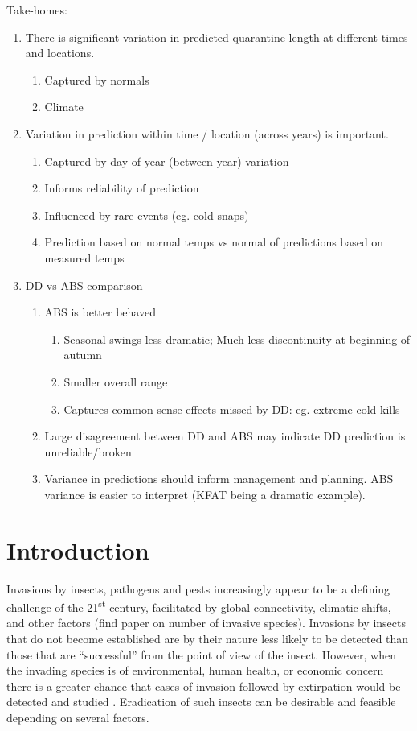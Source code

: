 \documentclass[10pt,a4paper,twocolumn]{article}
\begin{document}
Take-homes:
\begin{enumerate}
\item There is significant variation in predicted quarantine length 
at different times and locations.
  \begin{enumerate}
  \item Captured by normals
  \item Climate
  \end{enumerate}
\item Variation in prediction within time / location (across years) 
is important.
  \begin{enumerate}
  \item Captured by day-of-year (between-year) variation
  \item Informs reliability of prediction
  \item Influenced by rare events (eg. cold snaps)
  \item Prediction based on normal temps vs normal 
  of predictions based on measured temps
  \end{enumerate}
\item DD vs ABS comparison
  \begin{enumerate}
  \item ABS is better behaved
    \begin{enumerate}
    \item Seasonal swings less dramatic; 
    Much less discontinuity at beginning of autumn 
    \item Smaller overall range
    \item Captures common-sense effects missed by DD: 
    eg. extreme cold kills
    \end{enumerate}
  \item Large disagreement between DD and ABS may indicate 
  DD prediction is unreliable/broken
  \item Variance in predictions should inform management and planning.
  ABS variance is easier to interpret (KFAT being a dramatic example).
  \end{enumerate}
\end{enumerate}


\section*{Introduction}

Invasions by insects, pathogens and pests increasingly appear to be a 
defining challenge of the 21\textsuperscript{st} century, facilitated by global connectivity, climatic shifts, and
other factors \cite{simberloff_impacts_2013} (find paper on number of invasive species).
Invasions by insects that do not become established are by their nature less
likely to be detected than those that are ``successful''
from the point of view of the insect.
However, when the invading species is of environmental, human health, or 
economic concern there is a greater chance that cases of invasion followed 
by extirpation would be detected 
and studied \cite{liebhold_population_2008}.
Eradication of such insects can be desirable and 
feasible \cite{Myers2000Eradication} depending on several factors.
\end{document}
